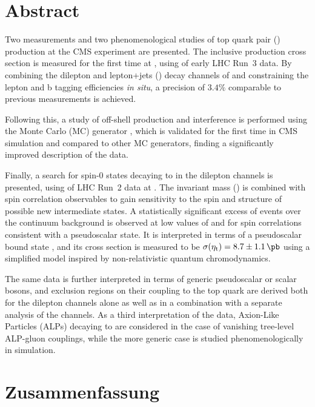 \cleardoublepage %
\chapter*{Abstract}

Two measurements and two phenomenological studies of top quark pair (\ttbar) production at the CMS experiment are presented. The inclusive \ttbar production cross section \sigmatt is measured for the first time at \sqrtsRIII, using \lumiRIII of early LHC Run~3 data. By combining the dilepton and lepton+jets (\ljets) decay channels of \ttbar and constraining the lepton and b tagging efficiencies \textit{in situ}, a precision of $3.4\%$ comparable to previous \sigmatt measurements is achieved.

Following this, a study of off-shell \ttbar production and \tttW interference is performed using the Monte Carlo (MC) generator \bbfourl, which is validated for the first time in CMS simulation and compared to other MC generators, finding a significantly improved description of the data.

Finally, a search for spin-0 states decaying to \ttbar in the dilepton channels is presented, using \lumiRII of LHC Run~2 data at \sqrtsRII. The invariant \ttbar mass (\mtt) is combined with spin correlation observables to gain sensitivity to the spin and \CP structure of possible new intermediate states. A statistically significant excess of events over the \ttbar continuum background is observed at low values of \mtt and for spin correlations consistent with a pseudoscalar state. It is interpreted in terms of a pseudoscalar \ttbar bound state \etat, and its cross section is measured to be $\sigetat =  8.7 \pm 1.1  \, \si{\pb}$ using a simplified model inspired by non-relativistic quantum chromodynamics. 

The same data is further interpreted in terms of generic pseudoscalar or scalar bosons, and exclusion regions on their coupling to the top quark are derived both for the dilepton channels alone as well as in a combination with a separate analysis of the \ljets channels. As a third interpretation of the data, Axion-Like Particles (ALPs) decaying to \ttbar are considered in the case of vanishing tree-level ALP-gluon couplings, while the more generic case is studied phenomenologically in simulation.

\cleardoublepage %
\chapter*{Zusammenfassung}

